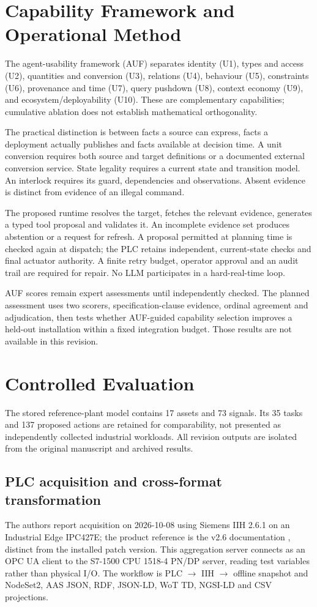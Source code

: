 \documentclass[10pt,journal,letterpaper]{IEEEtran}
\begin{document}

\section{Capability Framework and Operational Method}
The agent-usability framework (AUF) separates identity (U1), types and access
(U2), quantities and conversion (U3), relations (U4), behaviour (U5), constraints
(U6), provenance and time (U7), query pushdown (U8), context economy (U9), and
ecosystem/deployability (U10). These are complementary capabilities; cumulative
ablation does not establish mathematical orthogonality.

The practical distinction is between facts a source can express, facts a
deployment actually publishes and facts available at decision time. A unit
conversion requires both source and target definitions or a documented external
conversion service. State legality requires a current state and transition model.
An interlock requires its guard, dependencies and observations. Absent evidence
is distinct from evidence of an illegal command.

The proposed runtime resolves the target, fetches the relevant evidence, generates
a typed tool proposal and validates it. An incomplete evidence set produces
abstention or a request for refresh. A proposal permitted at planning time is
checked again at dispatch; the PLC retains independent, current-state checks and
final actuator authority. A finite retry budget, operator approval and an audit
trail are required for repair. No LLM participates in a hard-real-time loop.

AUF scores remain expert assessments until independently checked. The planned
assessment uses two scorers, specification-clause evidence, ordinal agreement
and adjudication, then tests whether AUF-guided capability selection improves a
held-out installation within a fixed integration budget. Those results are not
available in this revision.


\section{Controlled Evaluation}
The stored reference-plant model contains 17 assets and 73 signals. Its
35 tasks and 137 proposed actions are retained for comparability, not presented
as independently collected industrial workloads. All revision outputs are
isolated from the original manuscript and archived results.

\subsection{PLC acquisition and cross-format transformation}
The authors report acquisition on 2026-10-08 using Siemens IIH 2.6.1 on an
Industrial Edge IPC427E; the product reference is the v2.6 documentation
\cite{siemensIIH26firststeps}, distinct from the installed patch version.
This aggregation server connects as an OPC UA client
to the S7-1500 CPU 1518-4 PN/DP server, reading test variables rather than
physical I/O. The workflow is PLC $\to$ IIH $\to$ offline snapshot and NodeSet2,
AAS JSON, RDF, JSON-LD, WoT TD, NGSI-LD and CSV projections.
\end{document}
